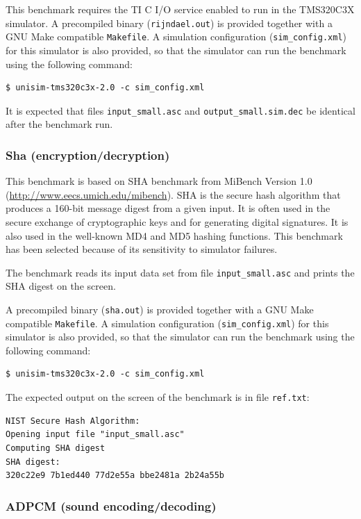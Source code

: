 This benchmark requires the TI C I/O service enabled to run in the TMS320C3X simulator.
A precompiled binary (\texttt{rijndael.out}) is provided together with a GNU Make compatible \texttt{Makefile}.
A simulation configuration (\texttt{sim\_config.xml}) for this simulator is also provided, so that the simulator can run the benchmark using the following command:

\begin{verbatim}
$ unisim-tms320c3x-2.0 -c sim_config.xml
\end{verbatim}

It is expected that files \texttt{input\_small.asc} and \texttt{output\_small.sim.dec} be identical after the benchmark run.

\subsubsection{Sha (encryption/decryption)}

This benchmark is based on SHA benchmark from MiBench Version 1.0 (\url{http://www.eecs.umich.edu/mibench}).
SHA is the secure hash algorithm that produces a 160-bit message digest from a given input.
It is often used in the secure exchange of cryptographic keys and for generating digital signatures.
It is also used in the well-known MD4 and MD5 hashing functions.
This benchmark has been selected because of its sensitivity to simulator failures.

The benchmark reads its input data set from file \texttt{input\_small.asc} and prints the SHA digest on the screen.

A precompiled binary (\texttt{sha.out}) is provided together with a GNU Make compatible \texttt{Makefile}.
A simulation configuration (\texttt{sim\_config.xml}) for this simulator is also provided, so that the simulator can run the benchmark using the following command:

\begin{verbatim}
$ unisim-tms320c3x-2.0 -c sim_config.xml
\end{verbatim}

The expected output on the screen of the benchmark is in file \texttt{ref.txt}:

\begin{verbatim}
NIST Secure Hash Algorithm:
Opening input file "input_small.asc"
Computing SHA digest
SHA digest:
320c22e9 7b1ed440 77d2e55a bbe2481a 2b24a55b
\end{verbatim}

\subsubsection{ADPCM (sound encoding/decoding)}

